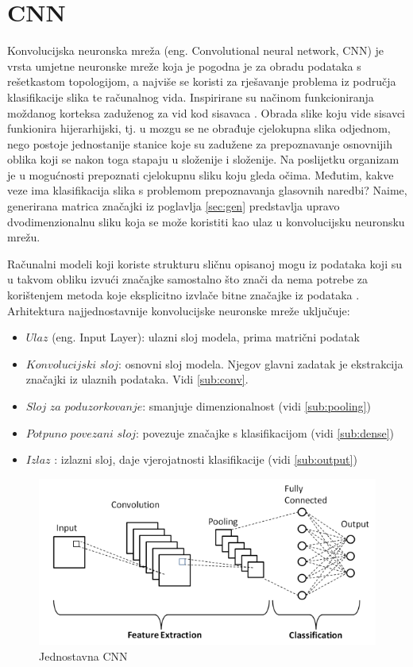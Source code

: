 \section{CNN}
\label{sec:cnn}

Konvolucijska neuronska mreža (eng. Convolutional neural network, CNN) je vrsta 
umjetne neuronske mreže koja je pogodna je za obradu podataka s rešetkastom
topologijom, a najviše se koristi za rješavanje problema iz područja klasifikacije slika
te računalnog vida. Inspirirane su načinom funkcioniranja moždanog korteksa 
zaduženog za vid kod sisavaca \cite{pycodemates}. Obrada slike koju vide sisavci
funkionira hijerarhijski, tj. u mozgu se ne obrađuje cjelokupna slika odjednom,
nego postoje jednostanije stanice koje su zadužene za prepoznavanje osnovnijih
oblika koji se nakon toga stapaju u složenije i složenije. Na poslijetku 
organizam je u mogućnosti prepoznati cjelokupnu sliku koju gleda očima.
Međutim, kakve veze ima klasifikacija slika s problemom prepoznavanja glasovnih naredbi?
Naime, generirana matrica značajki iz poglavlja \ref{sec:gen} predstavlja upravo dvodimenzionalnu
sliku koja se može koristiti kao ulaz u konvolucijsku neuronsku mrežu. 

Računalni modeli koji koriste strukturu sličnu opisanoj mogu iz
podataka koji su u takvom obliku izvući značajke samostalno što znači da nema
potrebe za korištenjem metoda koje eksplicitno izvlače bitne značajke iz podataka
\cite{1}. Arhitektura najjednostavnije konvolucijske neuronske mreže
uključuje:

\begin{itemize}
    \item \(Ulaz\) (eng. Input Layer): ulazni sloj modela, prima matrični podatak
    \item \(Konvolucijski\) \(sloj\): osnovni sloj modela. Njegov glavni zadatak
          je ekstrakcija značajki iz ulaznih podataka. Vidi \ref{sub:conv}.
    \item \(Sloj\) \(za\) \(poduzorkovanje\): smanjuje dimenzionalnost (vidi \ref{sub:pooling})
    \item \(Potpuno\) \(povezani\) \(sloj\): povezuje značajke s klasifikacijom (vidi \ref{sub:dense})
    \item \(Izlaz\) : izlazni sloj, daje vjerojatnosti klasifikacije (vidi \ref{sub:output})
\end{itemize}

\begin{figure}[htb]
    \centering
    \includegraphics[width=0.5\linewidth]{Chapters/neuronska_mreza/CNN/cnn.png} 
    \caption{Jednostavna CNN \cite{1}}
    \label{pic:cnn}
\end{figure}

